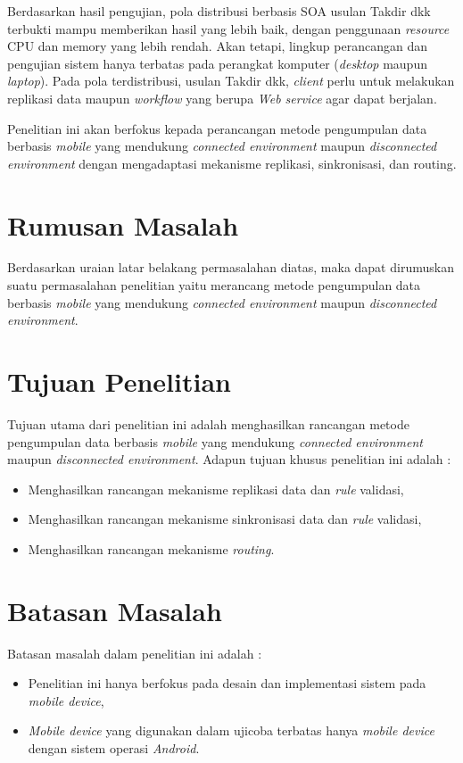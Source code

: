 Berdasarkan hasil pengujian, pola distribusi berbasis SOA usulan Takdir dkk terbukti mampu memberikan hasil yang lebih baik, dengan penggunaan \textit{resource} CPU dan memory yang lebih rendah. Akan tetapi, lingkup perancangan dan pengujian sistem hanya terbatas pada perangkat komputer (\textit{desktop} maupun \textit{laptop}). Pada pola terdistribusi, usulan Takdir dkk, \textit{client} perlu untuk melakukan replikasi data maupun \textit{workflow} yang berupa \textit{Web service} agar dapat berjalan. 

Penelitian ini akan berfokus kepada perancangan metode pengumpulan data berbasis \textit{mobile} yang mendukung \textit{connected environment} maupun \textit{disconnected environment} dengan mengadaptasi mekanisme replikasi, sinkronisasi, dan routing.


\section{Rumusan Masalah}
Berdasarkan uraian latar belakang permasalahan diatas, maka dapat dirumuskan suatu permasalahan penelitian yaitu merancang metode pengumpulan data berbasis \textit{mobile} yang mendukung \textit{connected environment} maupun \textit{disconnected environment}.

\section{Tujuan Penelitian}
Tujuan utama dari penelitian ini adalah menghasilkan rancangan metode pengumpulan data berbasis \textit{mobile} yang mendukung \textit{connected environment} maupun \textit{disconnected environment}. Adapun tujuan khusus penelitian ini adalah :
\begin{itemize}
\item Menghasilkan rancangan mekanisme replikasi data dan \textit{rule} validasi,
\item Menghasilkan rancangan mekanisme sinkronisasi data dan \textit{rule} validasi,
\item Menghasilkan rancangan mekanisme \textit{routing}.
\end{itemize}

\section{Batasan Masalah}
Batasan masalah dalam penelitian ini adalah :

\begin{itemize}
\item Penelitian ini hanya berfokus pada desain dan implementasi sistem pada \textit{mobile device},
\item \textit{Mobile device} yang digunakan dalam ujicoba terbatas hanya \textit{mobile device} dengan sistem operasi \textit{Android}.
\end{itemize}


